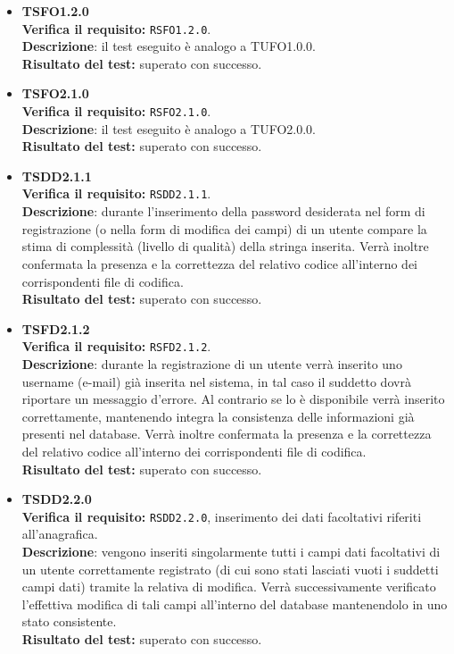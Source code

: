 \begin{itemize}
\item \textbf{TSFO1.2.0}\\
\textbf{Verifica il requisito:} \texttt{RSFO1.2.0}.\\
\textbf{Descrizione}: il test eseguito è analogo a TUFO1.0.0.\\
\textbf{Risultato del test:} superato con successo.

\item \textbf{TSFO2.1.0}\\
\textbf{Verifica il requisito:} \texttt{RSFO2.1.0}.\\
\textbf{Descrizione}: il test eseguito è analogo a TUFO2.0.0.\\
\textbf{Risultato del test:} superato con successo.

\item \textbf{TSDD2.1.1}\\
\textbf{Verifica il requisito:} \texttt{RSDD2.1.1}.\\
\textbf{Descrizione}: durante l'inserimento della password desiderata nel form di registrazione (o nella form di modifica dei campi) di un utente  compare la stima di complessità (livello di qualità) della stringa inserita. Verrà inoltre confermata la presenza e la correttezza  del relativo codice all'interno dei corrispondenti file di codifica.\\
\textbf{Risultato del test:} superato con successo.

\item \textbf{TSFD2.1.2}\\
\textbf{Verifica il requisito:} \texttt{RSFD2.1.2}.\\
\textbf{Descrizione}: durante la registrazione di un utente  verrà inserito uno username (e-mail) già inserita nel sistema, in tal caso il suddetto dovrà riportare un messaggio d'errore. Al contrario se lo  è disponibile verrà inserito correttamente, mantenendo integra la consistenza delle informazioni già presenti nel database. Verrà inoltre confermata la presenza e la correttezza  del relativo codice all'interno dei corrispondenti file di codifica.\\
\textbf{Risultato del test:} superato con successo.

\item \textbf{TSDD2.2.0}\\
\textbf{Verifica il requisito:} \texttt{RSDD2.2.0}, inserimento dei dati facoltativi riferiti all'anagrafica.\\
\textbf{Descrizione}: vengono inseriti singolarmente tutti i campi dati facoltativi di un utente  correttamente registrato (di cui sono stati lasciati vuoti i suddetti campi dati) tramite la relativa  di modifica. Verrà successivamente verificato l'effettiva modifica di tali campi all'interno del database mantenendolo in uno stato consistente.\\
\textbf{Risultato del test:} superato con successo.


\end{itemize}
